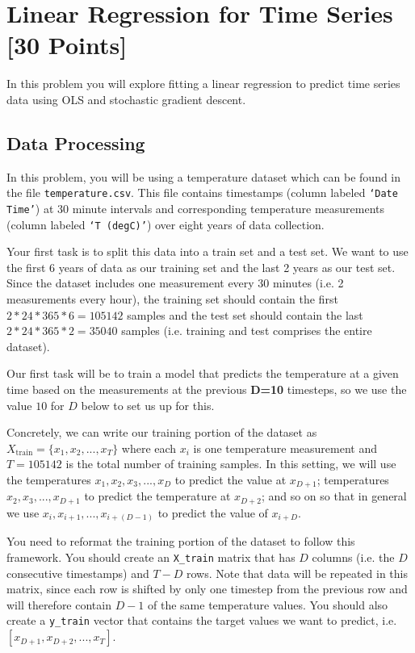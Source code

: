 \section{Linear Regression for Time Series [30 Points]}

In this problem you will explore fitting a linear regression to predict time series data using OLS and stochastic gradient descent.

\subsection{Data Processing}

In this problem, you will be using a temperature dataset which can be found in the file \texttt{temperature.csv}. This file contains timestamps (column labeled \texttt{`Date Time'}) at 30 minute intervals and corresponding temperature measurements (column labeled \texttt{`T (degC)'}) over eight years of data collection. 

Your first task is to split this data into a train set and a test set. We want to use the first 6 years of data as our training set and the last 2 years as our test set. Since the dataset includes one measurement every 30 minutes (i.e. 2 measurements every hour), the training set should contain the first $2 * 24 * 365 * 6 = 105142$ samples and the test set should contain the last $2 * 24 * 365 * 2 = 35040$ samples (i.e. training and test comprises the entire dataset).

Our first task will be to train a model that predicts the temperature at a given time based on the measurements at the previous \textbf{D=10} timesteps, so we use the value $10$ for $D$ below to set us up for this.

Concretely, we can write our training portion of the dataset as $X_{\mathrm{train}} = \{x_1, x_2, ... ,x_T \}$ where each $x_i$ is one temperature measurement and $T = 105142$ is the total number of training samples. 
In this setting, we will use the temperatures $x_1, x_2, x_3, ..., x_D$ to predict the value at $x_{D+1}$; temperatures $x_2, x_3, ..., x_{D+1}$ to predict the temperature at $x_{D+2}$; and so on so that in general we use $x_i, x_{i+1}, ..., x_{i+(D-1)}$ to predict the value of $x_{i+D}$.

You need to reformat the training portion of the dataset to follow this framework. You should create an \texttt{X\_train} matrix that has $D$ columns (i.e. the $D$ consecutive timestamps) and $T-D$ rows. Note that data will be repeated in this matrix, since each row is shifted by only one timestep from the previous row and will therefore contain $D-1$ of the same temperature values. You should also create a \texttt{y\_train} vector that contains the target values we want to predict, i.e. $[x_{D+1}, x_{D+2}, ..., x_T]$.

